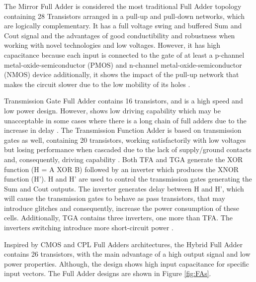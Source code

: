 \documentclass[pgmicro,mestrado,english]{iiufrgs}
\begin{document}
The Mirror Full Adder is considered the most traditional Full Adder topology containing 28 Transistors arranged in a pull-up and pull-down networks, which are logically complementary. It has a full voltage swing and buffered Sum and Cout signal and the advantages of good conductibility and robustness when working with novel technologies and low voltages. However, it has high capacitance because each input is connected to the gate of at least a p-channel metal-oxide-semiconductor (PMOS) and n-channel metal-oxide-semiconductor (NMOS) device additionally, it shows the impact of the pull-up network that makes the circuit slower due to the low mobility of its holes \cite{beckett2002fine} \cite{devadas2017design} \cite{islam2011design}.

Transmission Gate Full Adder \cite{weste1985principles} contains 16 transistors, and is a high speed and low power design. However, shows low driving capability which may be unacceptable in some cases where there is a long chain of full adders due to the increase in delay \cite{islam2011design}. The Transmission Function Adder is based on transmission gates as well, containing 20 transistors, working satisfactorily with low voltages but losing performance when cascaded due to the lack of supply/ground contacts and, consequently, driving capability \cite{navi2009novel}. Both TFA and TGA generate the XOR function (H = A XOR B) followed by an inverter which produces the XNOR function (H’). H and H’ are used to control the transmission gates generating the Sum and Cout outputs. The inverter generates delay between H and H’, which will cause the transmission gates to behave as pass transistors, that may introduce glitches and consequently, increase the power consumption of these cells. Additionally, TGA contains three inverters, one more than TFA. The inverters switching introduce more short-circuit power \cite{shams2000novel}.

Inspired by CMOS and CPL Full Adders architectures, the Hybrid Full Adder \cite{navi2009novel} contains 26 transistors, with the main advantage of a high output signal and low power properties. Although, the design shows high input capacitance for specific input vectors. The Full Adder designs are shown in Figure \ref{fig:FAs}.
\end{document}
